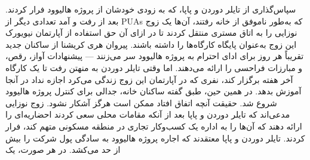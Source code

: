سپاس‌گذاری از تایلر دوردن و پاپا، که به زودی خودشان از پروژه هالیوود فرار کردند. بعد از رفت و آمد تعدادی دیگر از PUAs که به‌طور ناموفق از خانه رفتند، آن‌ها یک زوج نوزایی را به اتاق مستری منتقل کردند تا در ازای آن حق استفاده از آپارتمان نیویورک این زوج به‌عنوان پایگاه کارگاه‌ها را داشته باشند. پیروان هری کریشنا از ساکنان جدید تقریباً هر روز برای ادای احترام به پروژه هالیوود سر می‌زنند — پیشنهادات آواز، رقص، و مبارزات فراحسی را ارائه می‌دهند. اما وقتی تایلر دوردن به منهتن رفت تا یک کارگاه آخر هفته برگزار کند، نفری که در آپارتمان این زوج زندگی می‌کرد اجازه نداد در آنجا آموزش بدهد. در همین حین، طبق گفته ساکنان خانه، جدالی برای کنترل پروژه هالیوود شروع شد. حقیقت آنچه اتفاق افتاد ممکن است هرگز آشکار نشود. زوج نوزایی مدعی‌اند که تایلر دوردن و پاپا بعد از آنکه مقامات محلی سعی کردند احضاریه‌ای را ارائه دهند که آن‌ها را به اداره یک کسب‌وکار تجاری در منطقه مسکونی متهم کند، فرار کردند. تایلر دوردن و پاپا معتقدند که اجاره پروژه هالیوود به سادگی پول شرکت را بیش از حد می‌کشد. در هر صورت، یک